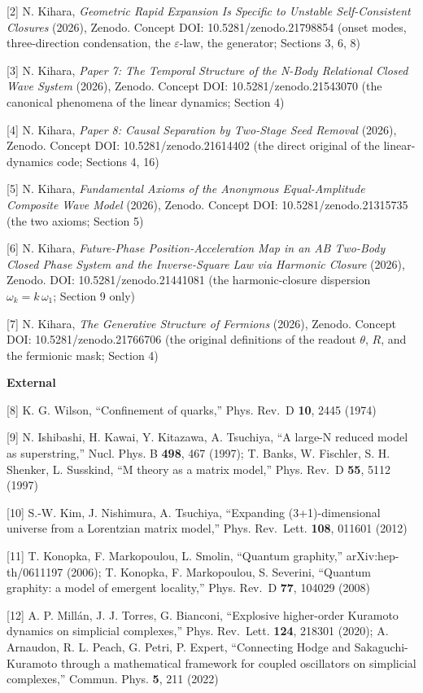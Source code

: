 \documentclass[
  a4paper,
]{article}
\begin{document}
{[}2{]} N. Kihara, \emph{Geometric Rapid Expansion Is Specific to
Unstable Self-Consistent Closures} (2026), Zenodo. Concept DOI:
10.5281/zenodo.21798854 (onset modes, three-direction condensation, the
\(\varepsilon\)-law, the generator; Sections 3, 6, 8)

{[}3{]} N. Kihara, \emph{Paper 7: The Temporal Structure of the N-Body
Relational Closed Wave System} (2026), Zenodo. Concept DOI:
10.5281/zenodo.21543070 (the canonical phenomena of the linear dynamics;
Section 4)

{[}4{]} N. Kihara, \emph{Paper 8: Causal Separation by Two-Stage Seed
Removal} (2026), Zenodo. Concept DOI: 10.5281/zenodo.21614402 (the
direct original of the linear-dynamics code; Sections 4, 16)

{[}5{]} N. Kihara, \emph{Fundamental Axioms of the Anonymous
Equal-Amplitude Composite Wave Model} (2026), Zenodo. Concept DOI:
10.5281/zenodo.21315735 (the two axioms; Section 5)

{[}6{]} N. Kihara, \emph{Future-Phase Position-Acceleration Map in an AB
Two-Body Closed Phase System and the Inverse-Square Law via Harmonic
Closure} (2026), Zenodo. DOI: 10.5281/zenodo.21441081 (the
harmonic-closure dispersion \(\omega_k=k\,\omega_1\); Section 9 only)

{[}7{]} N. Kihara, \emph{The Generative Structure of Fermions} (2026),
Zenodo. Concept DOI: 10.5281/zenodo.21766706 (the original definitions
of the readout \(\theta\), \(R\), and the fermionic mask; Section 4)

\textbf{External}

{[}8{]} K. G. Wilson, ``Confinement of quarks,'' Phys. Rev.~D
\textbf{10}, 2445 (1974)

{[}9{]} N. Ishibashi, H. Kawai, Y. Kitazawa, A. Tsuchiya, ``A large-N
reduced model as superstring,'' Nucl. Phys. B \textbf{498}, 467 (1997);
T. Banks, W. Fischler, S. H. Shenker, L. Susskind, ``M theory as a
matrix model,'' Phys. Rev.~D \textbf{55}, 5112 (1997)

{[}10{]} S.-W. Kim, J. Nishimura, A. Tsuchiya, ``Expanding
(3+1)-dimensional universe from a Lorentzian matrix model,'' Phys.
Rev.~Lett. \textbf{108}, 011601 (2012)

{[}11{]} T. Konopka, F. Markopoulou, L. Smolin, ``Quantum graphity,''
arXiv:hep-th/0611197 (2006); T. Konopka, F. Markopoulou, S. Severini,
``Quantum graphity: a model of emergent locality,'' Phys. Rev.~D
\textbf{77}, 104029 (2008)

{[}12{]} A. P. Millán, J. J. Torres, G. Bianconi, ``Explosive
higher-order Kuramoto dynamics on simplicial complexes,'' Phys.
Rev.~Lett. \textbf{124}, 218301 (2020); A. Arnaudon, R. L. Peach, G.
Petri, P. Expert, ``Connecting Hodge and Sakaguchi-Kuramoto through a
mathematical framework for coupled oscillators on simplicial
complexes,'' Commun. Phys. \textbf{5}, 211 (2022)
\end{document}
